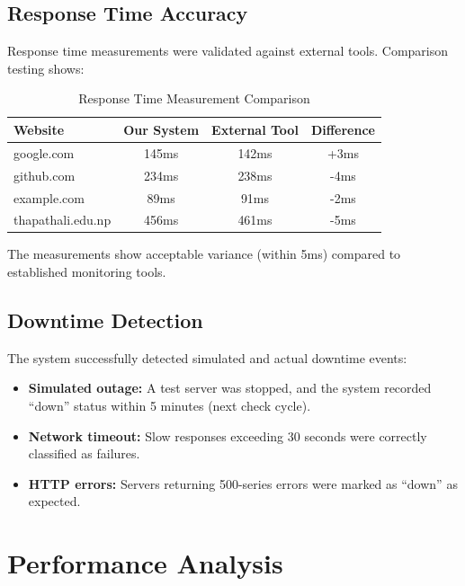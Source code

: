 \subsection{Response Time Accuracy}

Response time measurements were validated against external tools. Comparison testing shows:

\begin{table}[htbp]
    \centering
    \caption{Response Time Measurement Comparison}
    \label{tab:response-comparison}
    \begin{tabular}{lccc}
        \toprule
        \textbf{Website} & \textbf{Our System} & \textbf{External Tool} & \textbf{Difference} \\
        \midrule
        google.com & 145ms & 142ms & +3ms \\
        github.com & 234ms & 238ms & -4ms \\
        example.com & 89ms & 91ms & -2ms \\
        thapathali.edu.np & 456ms & 461ms & -5ms \\
        \bottomrule
    \end{tabular}
\end{table}

The measurements show acceptable variance (within 5ms) compared to established monitoring tools.

\subsection{Downtime Detection}

The system successfully detected simulated and actual downtime events:

\begin{itemize}
    \item \textbf{Simulated outage:} A test server was stopped, and the system recorded ``down'' status within 5 minutes (next check cycle).
    \item \textbf{Network timeout:} Slow responses exceeding 30 seconds were correctly classified as failures.
    \item \textbf{HTTP errors:} Servers returning 500-series errors were marked as ``down'' as expected.
\end{itemize}

\section{Performance Analysis}

